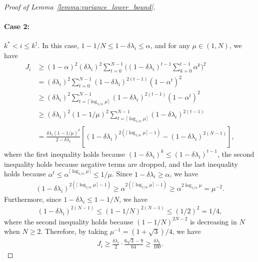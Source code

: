 \documentclass[11pt]{article}
\begin{document}
\begin{proof}[Proof of Lemma~\ref{lemma:variance_lower_bound}]
\paragraph{Case 2:} $k^*<i\le k^\dagger$. In this case, $1-1/N\le1-\delta\lambda_i\le\alpha$, and for any $\mu\in(1, N)$, we have
\begin{align*}
J_i&\ge(1-\alpha)^2(\delta\lambda_i)^2\sum_{t=0}^{N-1}\bigg((1-\delta\lambda_i)^{t-1}\sum_{k=0}^{t-1}\alpha^k\bigg)^2\\
&=(\delta\lambda_i)^2\sum_{t=0}^{N-1}(1-\delta\lambda_i)^{2(t-1)}(1-\alpha^t)^2\\
&\ge(\delta\lambda_i)^2\sum_{t=\lceil\log_{1/\alpha}\mu\rceil}^{N-1}(1-\delta\lambda_i)^{2(t-1)}(1-\alpha^t)^2\\
&\ge(\delta\lambda_i)^2(1-1/\mu)^2\sum_{t=\lceil\log_{1/\alpha}\mu\rceil}^{N-1}(1-\delta\lambda_i)^{2(t-1)}\\
&=\frac{\delta\lambda_i(1-1/\mu)^2}{2-\delta\lambda_i}[(1-\delta\lambda_i)^{2(\lceil\log_{1/\alpha}\mu\rceil-1)}-(1-\delta\lambda_i)^{2(N-1)}],
\end{align*}
where the first inequality holds because $(1-\delta\lambda_i)^k\le(1-\delta\lambda_i)^{t-1}$, the second inequality holds because negative terms are dropped, and the last inequality holds because $\alpha^t\le\alpha^{\lceil\log_{1/\alpha}\mu\rceil}\le1/\mu$. Since $1-\delta\lambda_i\ge\alpha$, we have
\begin{align*}
(1-\delta\lambda_i)^{2(\lceil\log_{1/\alpha}\mu\rceil-1)}\ge\alpha^{2(\lceil\log_{1/\alpha}\mu\rceil-1)}\ge\alpha^{2\log_{1/\alpha}\mu}=\mu^{-2}.
\end{align*}
Furthermore, since $1-\delta\lambda_i\le1-1/N$, we have
\begin{align*}
(1-\delta\lambda_i)^{2(N-1)}\le(1-1/N)^{2(N-1)}\le(1/2)^2=1/4,
\end{align*}
where the second inequality holds because $(1-1/N)^{2N-2}$ is decreasing in $N$ when $N\ge2$. Therefore, by taking $\mu^{-1}=(1+\sqrt3)/4$, we have
\begin{align*}
J_i\ge\frac{\delta\lambda_i}{2}\cdot\frac{6\sqrt3-9}{64}\ge\frac{\delta\lambda_i}{100}.
\end{align*}


\end{proof}
\end{document}
